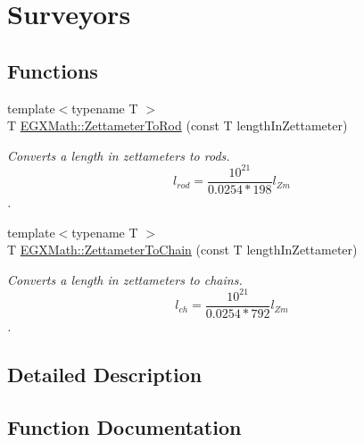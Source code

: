 \hypertarget{group___e_g_x_math-_conversions-_length_conversions-_zettameter-_surveyors}{}\section{Surveyors}
\label{group___e_g_x_math-_conversions-_length_conversions-_zettameter-_surveyors}
\subsection*{Functions}
\begin{DoxyCompactItemize}
\item 
{\footnotesize template$<$typename T $>$ }\\T \mbox{\hyperlink{group___e_g_x_math-_conversions-_length_conversions-_zettameter-_surveyors_gac9031bf1465b8a56ab426ac20d256741}{E\+G\+X\+Math\+::\+Zettameter\+To\+Rod}} (const T length\+In\+Zettameter)
\begin{DoxyCompactList}\small\item\em Converts a length in zettameters to rods. \[ l_{rod}= \frac{10^{21}}{0.0254 * 198} l_{Zm} \]. \end{DoxyCompactList}\item 
{\footnotesize template$<$typename T $>$ }\\T \mbox{\hyperlink{group___e_g_x_math-_conversions-_length_conversions-_zettameter-_surveyors_ga97af95fc842ded65d430a539ef8a3571}{E\+G\+X\+Math\+::\+Zettameter\+To\+Chain}} (const T length\+In\+Zettameter)
\begin{DoxyCompactList}\small\item\em Converts a length in zettameters to chains. \[ l_{ch}= \frac{10^{21}}{0.0254 * 792} l_{Zm} \]. \end{DoxyCompactList}\end{DoxyCompactItemize}


\subsection{Detailed Description}


\subsection{Function Documentation}
\mbox{\label{group___e_g_x_math-_conversions-_length_conversions-_zettameter-_surveyors_ga97af95fc842ded65d430a539ef8a3571}} 
